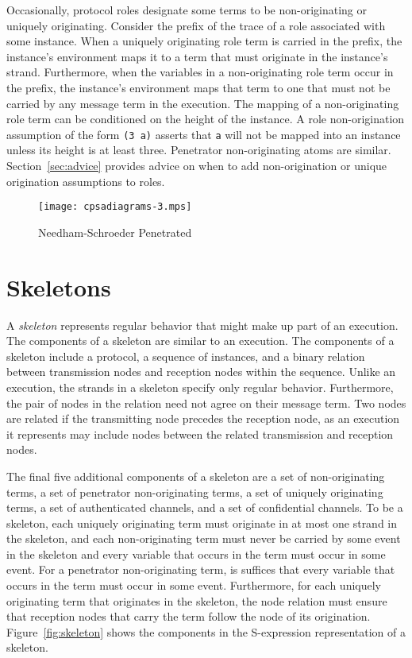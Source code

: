 \documentclass[12pt]{article}
\begin{document}
Occasionally, protocol roles designate some terms to be
non-originating or uniquely originating.  Consider the prefix of the
trace of a role associated with some instance.  When a uniquely
originating role term is carried in the prefix, the instance's
environment maps it to a term that must originate in the instance's
strand.  Furthermore, when the variables in a non-originating role
term occur in the prefix, the instance's environment maps that term to
one that must not be carried by any message term in the execution.
The mapping of a non-originating role term can be conditioned on the
height of the instance.  A role non-origination assumption of the form
\texttt{(3 a)} asserts that \texttt{a} will not be mapped into an
instance unless its height is at least three.  Penetrator
non-originating atoms are similar.  Section~\ref{sec:advice} provides
advice on when to add non-origination or unique origination
assumptions to roles.

\begin{figure}
\begin{center}
\texttt{[image: cpsadiagrams-3.mps]}
\caption{Needham-Schroeder Penetrated}
\label{fig:ns penetrated}
\end{center}
\end{figure}

\section{Skeletons}

A \emph{skeleton} represents regular behavior that might make up part
of an execution.  The components of a skeleton are similar to an
execution.  The components of a skeleton include a protocol, a
sequence of instances, and a binary relation between transmission
nodes and reception nodes within the sequence.  Unlike an execution,
the strands in a skeleton specify only regular behavior.  Furthermore,
the pair of nodes in the relation need not agree on their message
term.  Two nodes are related if the transmitting node precedes the
reception node, as an execution it represents may include nodes
between the related transmission and reception nodes.

The final five additional components of a skeleton are a set of
non-originating terms, a set of penetrator non-originating terms,
a set of uniquely originating terms, a set of authenticated channels,
and a set of confidential channels.  To be a skeleton, each uniquely
originating term must originate in at most one strand in the skeleton,
and each non-originating term must never be carried by some event in
the skeleton and every variable that occurs in the term must occur in
some event.  For a penetrator non-originating term, is suffices that
every variable that occurs in the term must occur in some event.
Furthermore, for each uniquely originating term that originates in the
skeleton, the node relation must ensure that reception nodes that
carry the term follow the node of its origination.
Figure~\ref{fig:skeleton} shows the components in the S-expression
representation of a skeleton.
\end{document}
